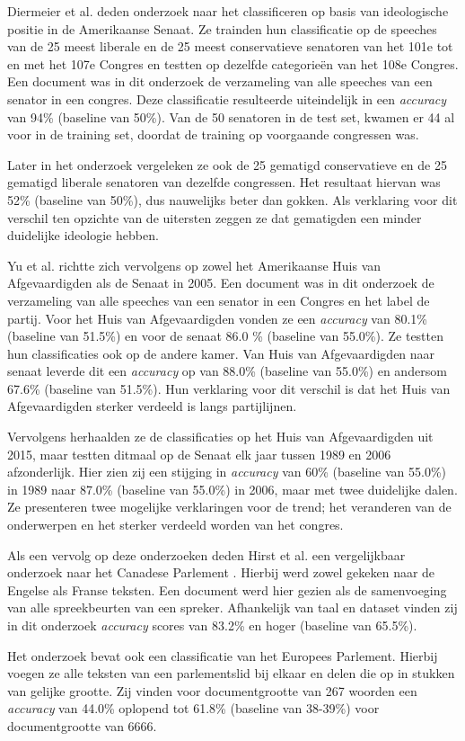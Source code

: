 Diermeier et al. deden onderzoek naar het classificeren op basis van ideologische positie in de Amerikaanse Senaat\cite{diermeier_godbout_yu_kaufmann_2012}. Ze trainden hun classificatie op de speeches van de 25 meest liberale en de 25 meest conservatieve senatoren van het 101e tot en met het 107e Congres en testten op dezelfde categorieën van het 108e Congres. Een document was in dit onderzoek de verzameling van alle speeches van een senator in een congres. Deze classificatie resulteerde uiteindelijk in een \textit{accuracy} van 94\% (baseline van 50\%). Van de 50 senatoren in de test set, kwamen er 44 al voor in de training set, doordat de training op voorgaande congressen was.\par
Later in het onderzoek vergeleken ze ook de 25 gematigd conservatieve  en de 25 gematigd liberale senatoren van dezelfde congressen. Het resultaat hiervan was 52\% (baseline van 50\%), dus nauwelijks beter dan gokken. Als verklaring voor dit verschil ten opzichte van de uitersten zeggen ze dat gematigden een minder duidelijke ideologie hebben.\par
Yu et al. \cite{doi:10.1080/19331680802149608} richtte zich vervolgens op zowel het Amerikaanse Huis van Afgevaardigden als de Senaat in 2005. Een document was in dit onderzoek de verzameling van alle speeches van een senator in een Congres en het label de partij. Voor het Huis van Afgevaardigden vonden ze een \textit{accuracy} van 80.1\% (baseline van 51.5\%) en voor de senaat 86.0 \% (baseline van 55.0\%). Ze testten hun classificaties ook op de andere kamer. Van Huis van Afgevaardigden naar senaat leverde dit een \textit{accuracy} op van 88.0\% (baseline van 55.0\%) en andersom 67.6\% (baseline van 51.5\%). Hun verklaring voor dit verschil is dat het Huis van Afgevaardigden sterker verdeeld is langs partijlijnen.\par
Vervolgens herhaalden ze de classificaties op het Huis van Afgevaardigden uit 2015, maar testten ditmaal op de Senaat elk jaar tussen 1989 en 2006 afzonderlijk. Hier zien zij een stijging in \textit{accuracy} van 60\% (baseline van 55.0\%) in 1989 naar 87.0\% (baseline van 55.0\%) in 2006, maar met twee duidelijke dalen. Ze presenteren twee mogelijke verklaringen voor de trend; het veranderen van de onderwerpen en het sterker verdeeld worden van het congres. \par
Als een vervolg op deze onderzoeken deden Hirst et al. een vergelijkbaar onderzoek naar het Canadese Parlement \cite{Hirst_textto}. Hierbij werd zowel gekeken naar de Engelse als Franse teksten. Een document werd hier gezien als de samenvoeging van alle spreekbeurten van een spreker. Afhankelijk van taal en dataset vinden zij in dit onderzoek \textit{accuracy} scores van 83.2\%  en hoger (baseline van 65.5\%).\par
Het onderzoek bevat ook een classificatie van het Europees Parlement. Hierbij voegen ze alle teksten van een parlementslid bij elkaar en delen die op in stukken van gelijke grootte. Zij vinden voor documentgrootte van 267 woorden een \textit{accuracy} van 44.0\% oplopend tot 61.8\% (baseline van 38-39\%) voor documentgrootte van 6666.\par

